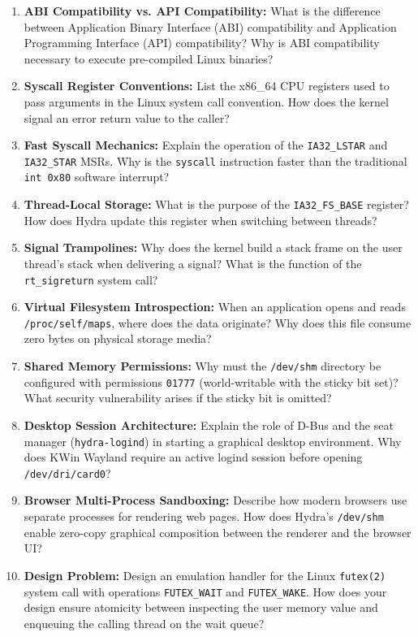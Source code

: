 \begin{enumerate}
    \item \textbf{ABI Compatibility vs. API Compatibility:} What is the difference between Application Binary Interface (ABI) compatibility and Application Programming Interface (API) compatibility? Why is ABI compatibility necessary to execute pre-compiled Linux binaries?
    \item \textbf{Syscall Register Conventions:} List the x86\_64 CPU registers used to pass arguments in the Linux system call convention. How does the kernel signal an error return value to the caller?
    \item \textbf{Fast Syscall Mechanics:} Explain the operation of the \texttt{IA32\_LSTAR} and \texttt{IA32\_STAR} MSRs. Why is the \texttt{syscall} instruction faster than the traditional \texttt{int 0x80} software interrupt?
    \item \textbf{Thread-Local Storage:} What is the purpose of the \texttt{IA32\_FS\_BASE} register? How does Hydra update this register when switching between threads?
    \item \textbf{Signal Trampolines:} Why does the kernel build a stack frame on the user thread's stack when delivering a signal? What is the function of the \texttt{rt\_sigreturn} system call?
    \item \textbf{Virtual Filesystem Introspection:} When an application opens and reads \texttt{/proc/self/maps}, where does the data originate? Why does this file consume zero bytes on physical storage media?
    \item \textbf{Shared Memory Permissions:} Why must the \texttt{/dev/shm} directory be configured with permissions \texttt{01777} (world-writable with the sticky bit set)? What security vulnerability arises if the sticky bit is omitted?
    \item \textbf{Desktop Session Architecture:} Explain the role of D-Bus and the seat manager (\texttt{hydra-logind}) in starting a graphical desktop environment. Why does KWin Wayland require an active logind session before opening \texttt{/dev/dri/card0}?
    \item \textbf{Browser Multi-Process Sandboxing:} Describe how modern browsers use separate processes for rendering web pages. How does Hydra's \texttt{/dev/shm} enable zero-copy graphical composition between the renderer and the browser UI?
    \item \textbf{Design Problem:} Design an emulation handler for the Linux \texttt{futex(2)} system call with operations \texttt{FUTEX\_WAIT} and \texttt{FUTEX\_WAKE}. How does your design ensure atomicity between inspecting the user memory value and enqueuing the calling thread on the wait queue?
\end{enumerate}
